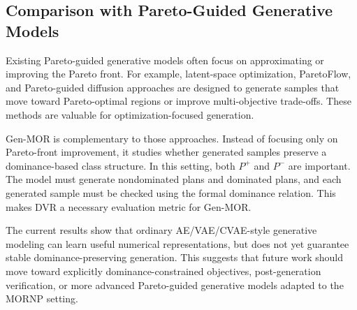 \subsection{Comparison with Pareto-Guided Generative Models}
\label{subsec:comparison_pareto_guided_models}

Existing Pareto-guided generative models often focus on approximating or improving the Pareto front. For example, latent-space optimization, ParetoFlow, and Pareto-guided diffusion approaches are designed to generate samples that move toward Pareto-optimal regions or improve multi-objective trade-offs. These methods are valuable for optimization-focused generation.

Gen-MOR is complementary to those approaches. Instead of focusing only on Pareto-front improvement, it studies whether generated samples preserve a dominance-based class structure. In this setting, both $P^{+}$ and $P^{-}$ are important. The model must generate nondominated plans and dominated plans, and each generated sample must be checked using the formal dominance relation. This makes DVR a necessary evaluation metric for Gen-MOR.

The current results show that ordinary AE/VAE/CVAE-style generative modeling can learn useful numerical representations, but does not yet guarantee stable dominance-preserving generation. This suggests that future work should move toward explicitly dominance-constrained objectives, post-generation verification, or more advanced Pareto-guided generative models adapted to the MORNP setting.